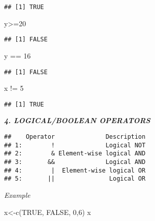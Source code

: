 \documentclass[
]{article}
\newenvironment{Shaded}{\begin{snugshade}}{\end{snugshade}}
\newcommand{\ConstantTok}[1]{\textcolor[rgb]{0.00,0.00,0.00}{#1}}
\newcommand{\DecValTok}[1]{\textcolor[rgb]{0.00,0.00,0.81}{#1}}
\newcommand{\FunctionTok}[1]{\textcolor[rgb]{0.00,0.00,0.00}{#1}}
\newcommand{\NormalTok}[1]{#1}
\newcommand{\OtherTok}[1]{\textcolor[rgb]{0.56,0.35,0.01}{#1}}
\newcommand{\SpecialCharTok}[1]{\textcolor[rgb]{0.00,0.00,0.00}{#1}}
\begin{document}
\begin{verbatim}
## [1] TRUE
\end{verbatim}

\begin{Shaded}
\begin{Highlighting}[]
\NormalTok{y}\SpecialCharTok{\textgreater{}=}\DecValTok{20}
\end{Highlighting}
\end{Shaded}

\begin{verbatim}
## [1] FALSE
\end{verbatim}

\begin{Shaded}
\begin{Highlighting}[]
\NormalTok{y }\SpecialCharTok{==} \DecValTok{16}
\end{Highlighting}
\end{Shaded}

\begin{verbatim}
## [1] FALSE
\end{verbatim}

\begin{Shaded}
\begin{Highlighting}[]
\NormalTok{x }\SpecialCharTok{!=} \DecValTok{5}
\end{Highlighting}
\end{Shaded}

\begin{verbatim}
## [1] TRUE
\end{verbatim}

\textbf{\emph{4. LOGICAL/BOOLEAN OPERATORS}}

\begin{verbatim}
##    Operator              Description
## 1:        !              Logical NOT
## 2:        & Element-wise logical AND
## 3:       &&              Logical AND
## 4:        |  Element-wise logical OR
## 5:       ||               Logical OR
\end{verbatim}

\emph{Example}

\begin{Shaded}
\begin{Highlighting}[]
\NormalTok{x}\OtherTok{\textless{}{-}}\FunctionTok{c}\NormalTok{(}\ConstantTok{TRUE}\NormalTok{, }\ConstantTok{FALSE}\NormalTok{, }\DecValTok{0}\NormalTok{,}\DecValTok{6}\NormalTok{)}
\NormalTok{x}
\end{Highlighting}
\end{Shaded}
\end{document}
